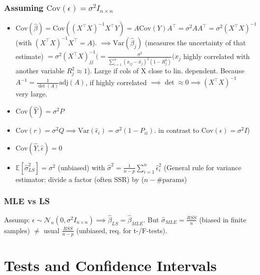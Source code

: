 \subsubsection*{Assuming $\text{Cov}(\epsilon)=\sigma^2 I_{n \times n}$}
\begin{itemize}
    \item $\text{Cov}(\hat{\beta}) = \text{Cov}((X^\top X)^{-1} X^\top Y) = A \text{Cov}(Y) A^\top = \sigma^2 A A^\top = \sigma^2 (X^\top X)^{-1}$ (with $(X^\top X)^{-1} X^\top =A$).
    $\implies \text{Var}(\hat{\beta}_j)$ (measures the uncertainty of that estimate) $= \sigma^2(X^\top X)^{-1}_{jj} (=\frac{\sigma^2}{\sum_{i=1}^{n} (x_{ij} - \bar{x}_j)^2 (1 - R_j^2)} (x_j$ highly correlated with another variable $R_j^2 \approx 1$). Large if cols of X close to lin. dependent. Because $A^{-1} = \frac{1}{\det(A)}\text{adj}(A)$, if highly correlated $\implies \det \approx 0 \implies (X^\top X)^{-1}$ very large.
    \item $\text{Cov}(\hat{Y}) = \sigma^2 P$
    \item $\text{Cov}(r) = \sigma^2 Q \implies \text{Var}(\hat{\epsilon}_i) = \sigma^2(1-P_{ii})$. in contrast to $\text{Cov}(\epsilon)=\sigma^2 I$)
    \item $\text{Cov}(\hat{Y}, \hat{\epsilon}) = 0$
    \item $\mathbb{E}[\hat{\sigma}_{LS}^2] = \sigma^2$ (unbiased) with $\hat{\sigma}^2 = \frac{1}{n-p}\sum_{i=1}^n \hat{\epsilon}_i^2$ (General rule for variance estimator: divide a factor (often SSR) by ($n - \#\text{params}$)
\end{itemize}

\subsubsection*{MLE vs LS}
Assump: $\epsilon \sim \mathcal{N}_n(0, \sigma^2 I_{n\times n}) \implies \hat{\beta}_{LS}{=}\hat{\beta}_{MLE}$.
But $\hat{\sigma}_{MLE} = \frac{RSS}{n}$ (biased in finite samples)
$\neq$ usual $\frac{RSS}{n-p}$ (unbiased, req. for t-/F-tests).

\section{Tests and Confidence Intervals}
